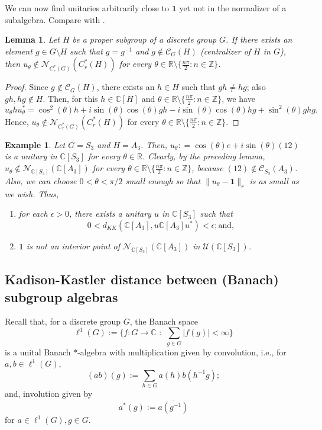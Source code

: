 \documentclass{amsart}
\numberwithin{equation}{section}
\newcommand{\Z}{\mathbb Z}
\newcommand{\R}{\mathbb R}
\newcommand{\C}{\mathbb C}
\newcommand{\1}{\mathbf{1}}
\newcommand{\mC}{\mathcal{C}}
\newtheorem{lemma}[theorem]{Lemma}
\newtheorem{example}[theorem]{Example}
\begin{document}
We can now find unitaries arbitrarily close to $\1$ yet not in the
normalizer of a subalgebra. Compare with .

\begin{lemma}\label{u-theta-normalizer}
Let $H$ be a proper subgroup of a discrete group $G$. If there exists
an element $g \in G \setminus H$ such that $g= g^{-1}$ and $g \notin
\mC_{G}(H)$ (centralizer of $H$ in $G$), then $u_{\theta}\notin
\mathcal{N}_{C^*_r(G)}(C^*_r(H))$ for every $\theta \in\R \setminus
\{\frac{n\pi}{2}: n\in \Z\}$.
\end{lemma}

\begin{proof}
Since $g \notin \mC_{G}(H)$, there exists an $h \in H$ such that $gh\neq hg$;  also $gh, hg \notin H$. Then, for this $h \in \C[H]$ and $\theta \in\R \setminus
\{\frac{n\pi}{2}: n\in \Z\}$, we have
\[
u_{\theta}hu_{\theta}^{*}= \cos^{2}(\theta)h
+i \sin (\theta)\cos (\theta)gh- i \sin (\theta) \cos (\theta)hg+
\sin^{2} (\theta)ghg.
\]
Hence, $u_{\theta}\notin
\mathcal{N}_{C^*_r(G)}(C^*_r(H))$ for every $\theta \in\R \setminus
\{\frac{n\pi}{2}: n\in \Z\}$.
\end{proof}

\begin{example}\label{u-theta-S3}
Let $G = S_3$ and $H = A_3$.  Then, $u_{\theta}: = \cos(\theta) e + i
\sin (\theta) (12)$ is a unitary in $\C[S_3]$ for every $\theta \in
\R$. Clearly, by the preceding lemma, $u_\theta \notin
\mathcal{N}_{\C[S_3]}(\C[A_3])$ for every $\theta \in\R \setminus
\{\frac{n\pi}{2}: n\in \Z\}$, because $(12) \notin
\mC_{S_3}(A_3)$. Also, we can choose $0 < \theta < \pi/2$ small enough
so that $\|u_\theta - \1\|_r$ is as small as we wish. Thus,
\begin{enumerate}
\item  for each $\epsilon > 0$, there exists a unitary $u$ in $\C[S_3]$ such that
\[
0< d_{KK}(\C[A_3], u \C[A_3] u^*) < \epsilon; \text{and,}
\]
\item $\1$ is not an interior point of
  $\mathcal{N}_{\C[S_3]}(\C[A_3])$ in $\mathcal{U}(\C[S_3])$.
\end{enumerate}
\end{example}


\subsection{Kadison-Kastler distance between (Banach) subgroup algebras}
Recall that, for a discrete group $G$, the Banach space
\[
\ell^1(G):= \Big\{f : G\rightarrow \C \,\,:\,\, \sum_{g \in G}|f(g)| <
\infty \Big\}
\]
is a unital Banach $*$-algebra with multiplication  given by
convolution, i.e., for $a, b \in \ell^1(G),$
$$(ab)(g):= \sum_{h \in G}a(h)b(h^{-1}g);$$
and, involution  given by
$$ a^{*}(g):= \overline{a(g^{-1})}$$ for $a \in \ell^1(G), g \in G.$
\end{document}
